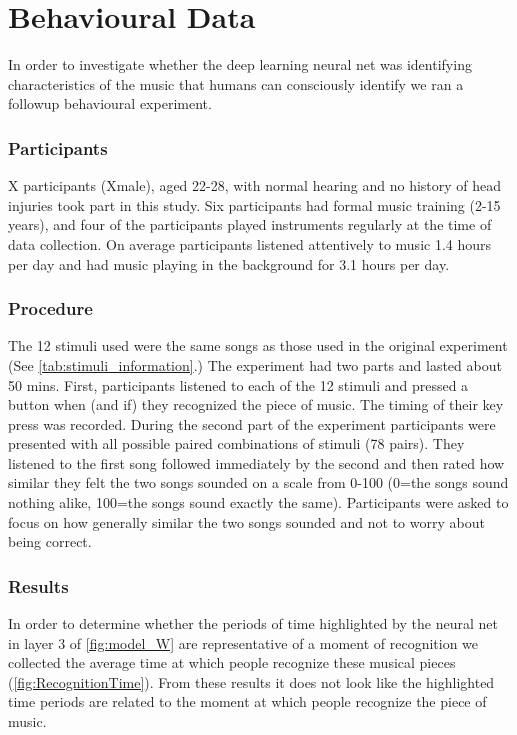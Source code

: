 \chapter*{Behavioural Data}

In order to investigate whether the deep learning neural net was identifying characteristics of the music that humans can consciously identify we ran a followup behavioural experiment. 

\subsection*{Participants}
X participants (Xmale), aged 22-28, with normal hearing and no history of head injuries took part in this study. Six participants had formal music training (2-15 years), and four of the participants played instruments regularly at the time of data collection. On average participants listened attentively to music 1.4 hours per day and had music playing in the background for 3.1 hours per day. 
\subsection*{Procedure}
The 12 stimuli used were the same songs as those used in the original experiment (See \autoref{tab:stimuli_information}.)
The experiment had two parts and lasted about 50 mins.
First, participants listened to each of the 12 stimuli and pressed a button when (and if) they recognized the piece of music.
The timing of their key press was recorded. 
During the second part of the experiment participants were presented with all possible paired combinations of stimuli (78 pairs). 
They listened to the first song followed immediately by the second and then rated how similar they felt the two songs sounded on a scale from 0-100 (0=the songs sound nothing alike, 100=the songs sound exactly the same).
Participants were asked to focus on how generally similar the two songs sounded and not to worry about being correct.

\subsection*{Results}
In order to determine whether the periods of time highlighted by the neural net in layer 3 of \autoref{fig:model_W} are representative of a moment of recognition we collected the average time at which people recognize these musical pieces (\autoref{fig:RecognitionTime}). 
From these results it does not look like the highlighted time periods are related to the moment at which people recognize the piece of music. 

